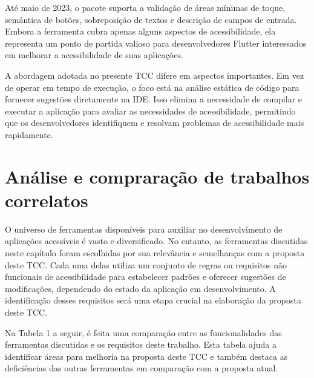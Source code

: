 Até maio de 2023, o pacote suporta a validação de áreas mínimas de toque, semântica de botões, sobreposição de textos e descrição de campos de entrada. Embora a ferramenta cubra apenas alguns aspectos de acessibilidade, ela representa um ponto de partida valioso para desenvolvedores Flutter interessados em melhorar a acessibilidade de suas aplicações.

A abordagem adotada no presente TCC difere em aspectos importantes. Em vez de operar em tempo de execução, o foco está na análise estática de código para fornecer sugestões diretamente na IDE. Isso elimina a necessidade de compilar e executar a aplicação para avaliar as necessidades de acessibilidade, permitindo que os desenvolvedores identifiquem e resolvam problemas de acessibilidade mais rapidamente.

\section{Análise e compraração de trabalhos correlatos}

O universo de ferramentas disponíveis para auxiliar no desenvolvimento de aplicações acessíveis é vasto e diversificado. No entanto, as ferramentas discutidas neste capítulo foram escolhidas por sua relevância e semelhanças com a proposta deste TCC. Cada uma delas utiliza um conjunto de regras ou requisitos não funcionais de acessibilidade para estabelecer padrões e oferecer sugestões de modificações, dependendo do estado da aplicação em desenvolvimento. A identificação desses requisitos será uma etapa crucial na elaboração da proposta deste TCC.

Na Tabela 1 a seguir, é feita uma comparação entre as funcionalidades das ferramentas discutidas e os requisitos deste trabalho. Esta tabela ajuda a identificar áreas para melhoria na proposta deste TCC e também destaca as deficiências das outras ferramentas em comparação com a proposta atual.

